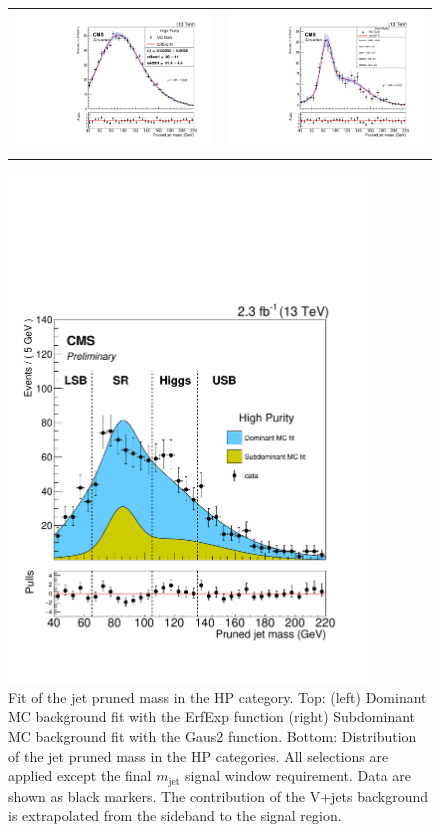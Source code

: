 \begin{figure}[!ht]
\caption{ Fit of the jet pruned mass in the HP category. Top: (left) Dominant MC background fit with the ErfExp function (right) Subdominant MC background fit with the Gaus2 function. Bottom: Distribution of the jet pruned mass in the HP categories. All selections are applied except the final $m_{\text{jet}}$ signal window requirement. Data are shown as black markers. The contribution of the V+jets background is extrapolated from the sideband to the signal region.}
\begin{tabular}{cc}
  \includegraphics[width=250pt]{figuresARC/Vjets/DomHP.pdf} &
\includegraphics[width=250pt]{figuresARC/Vjets/SubDomHP.pdf}\\
\end{tabular}
\begin{center}
  \includegraphics[width=270pt]{figuresARC/Vjets/dataMjUB3HP.pdf}

\end{center}
\end{figure}

